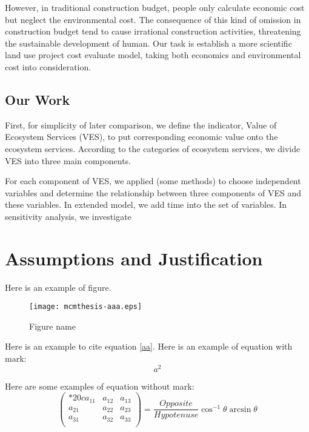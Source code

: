 \documentclass{mcmthesis}
\begin{document}
However, in traditional construction budget, people only calculate economic cost but neglect the environmental cost. The consequence of this kind of omission in construction budget tend to cause irrational construction activities, threatening the sustainable development of human. Our task is establish a more scientific land use project cost evaluate model, taking both economics and environmental cost into consideration.


\subsection{Our Work}
First, for simplicity of later comparison, we define the indicator, Value of Ecosystem Services (VES), to put corresponding economic value onto the ecosystem services. According to the categories of ecosystem services, we divide VES into three main components.

For each component of VES, we applied (some methods) to choose independent variables and determine the relationship between three components of VES and these variables. In extended model, we add time into the set of variables. In sensitivity analysis, we investigate 

\section{Assumptions and Justification}
Here is an example of figure.
\begin{figure}[h]
\small
\centering
\texttt{[image: mcmthesis-aaa.eps]}%
\caption{Figure name} \label{Label of figure}
\end{figure}

Here is an example to cite equation \eqref{aa}. Here is an example of equation with mark:
\begin{equation}
a^2 \label{aa}%
\end{equation}

Here are some examples of equation without mark:
\[
  \begin{pmatrix}{*{20}c}
  {a_{11} } & {a_{12} } & {a_{13} }  \\
  {a_{21} } & {a_{22} } & {a_{23} }  \\
  {a_{31} } & {a_{32} } & {a_{33} }  \\
  \end{pmatrix}
  = \frac{{Opposite}}{{Hypotenuse}}\cos ^{ - 1} \theta \arcsin \theta
\]
\end{document}
